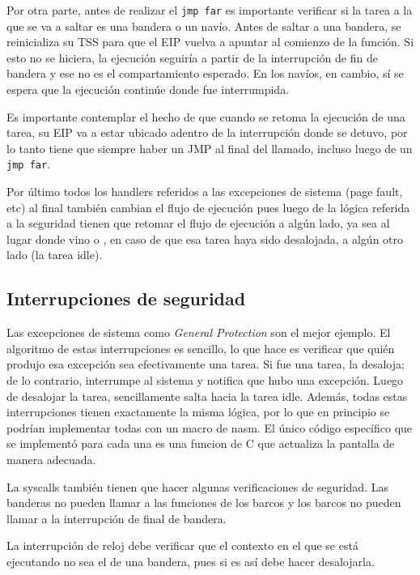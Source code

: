 	Por otra parte, antes de realizar el \texttt{jmp far} es importante
verificar si la tarea a la que se va a saltar es una bandera o un
navío. Antes de saltar a una bandera, se reinicializa su TSS para
que el EIP vuelva a apuntar al comienzo de la función. Si esto no se hiciera, 
la ejecución seguiría a partir de la interrupción de fin de bandera
y ese no es el compartamiento esperado. En los navíos, en cambio, sí se espera
que la ejecución continúe donde fue interrumpida.

	Es importante contemplar el hecho de que cuando se retoma la ejecución de una tarea, 
su EIP va a estar ubicado adentro de la interrupción donde se detuvo, por lo tanto tiene 
que siempre haber un JMP al final del llamado, incluso luego de un \texttt{jmp far}.
	
	Por último todos los handlers referidos a las excepciones de
sistema (page fault, etc) al final también cambian el flujo de ejecución
pues luego de la lógica referida a la seguridad tienen que retomar
el flujo de ejecución a algún lado, ya sea al lugar donde vino o
, en caso de que esa tarea haya sido desalojada, a algún otro lado
(la tarea idle).

\subsection{Interrupciones de seguridad}

	Las excepciones de sistema como \textit{General Protection}
son el mejor ejemplo. El algoritmo de estas interrupciones es
sencillo, lo que hace es verificar que quién produjo
esa excepción sea efectivamente una tarea. Si fue una tarea, la desaloja; de lo 
contrario, interrumpe al sistema y notifica que hubo una excepción. Luego
de desalojar la tarea, sencillamente salta hacia la tarea idle. Además, 
todas estas interrupciones tienen exactamente la misma lógica, por lo 
que en principio se podrían implementar todas con un macro de nasm.
El único código específico que se implementó para cada una es una funcion de C
que actualiza la pantalla de manera adecuada.

	La syscalls también tienen que hacer algunas verificaciones de
seguridad. Las banderas no pueden llamar a las funciones de los barcos
y los barcos no pueden llamar a la interrupción de final de bandera.

	La interrupción de reloj debe verificar que el contexto en el
que se está ejecutando no sea el de una bandera, pues si es así
debe hacer desalojarla. 



